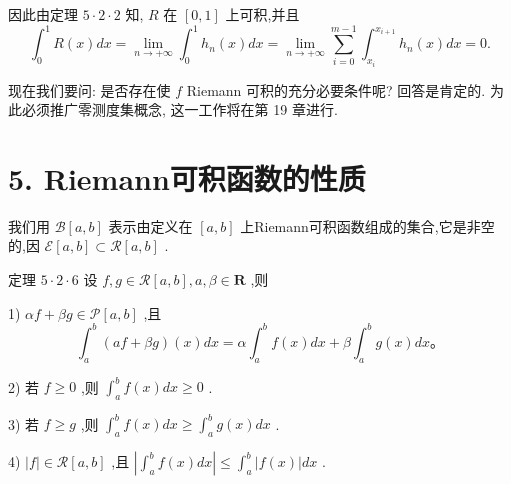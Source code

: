 因此由定理 $5 \cdot  2 \cdot  2$ 知, $R$ 在 $\left\lbrack  {0,1}\right\rbrack$ 上可积,并且
$${\int }_{0}^{1}R\left( x\right) {dx} = \mathop{\lim }\limits_{{n \rightarrow   + \infty }}{\int }_{0}^{1}{h}_{n}\left( x\right) {dx} = \mathop{\lim }\limits_{{n \rightarrow   + \infty }}\mathop{\sum }\limits_{{i = 0}}^{{m - 1}}{\int }_{{x}_{i}}^{{x}_{i + 1}}{h}_{n}\left( x\right) {dx} = 0.$$

现在我们要问: 是否存在使 $f$ Riemann 可积的充分必要条件呢? 回答是肯定的. 为此必须推广零测度集概念, 这一工作将在第 19 章进行.


\section*{5. Riemann可积函数的性质}

我们用 $\mathcal{B}\left\lbrack  {a,b}\right\rbrack$ 表示由定义在 $\left\lbrack  {a,b}\right\rbrack$ 上Riemann可积函数组成的集合,它是非空的,因 $\mathcal{E}\left\lbrack  {a,b}\right\rbrack   \subset  \mathcal{R}\left\lbrack  {a,b}\right\rbrack$ .

定理 $5 \cdot  2 \cdot  6$ 设 $f,g \in  \mathcal{R}\left\lbrack  {a,b}\right\rbrack  ,a,\beta  \in  \mathbf{R}$ ,则

1) ${\alpha f} + {\beta g} \in  \mathcal{P}\left\lbrack  {a,b}\right\rbrack$ ,且
$${\int }_{a}^{b}\left( {{af} + {\beta g}}\right) \left( x\right) {dx} = \alpha {\int }_{a}^{b}f\left( x\right) {dx} + \beta {\int }_{a}^{b}g\left( x\right) {dx}。$$

2) 若 $f \geq  0$ ,则 ${\int }_{a}^{b}f\left( x\right) {dx} \geq  0$ .

3) 若 $f \geq  g$ ,则 ${\int }_{a}^{b}f\left( x\right) {dx} \geq  {\int }_{a}^{b}g\left( x\right) {dx}$ .

4) $\left| f\right|  \in  \mathcal{R}\left\lbrack  {a,b}\right\rbrack$ ,且 $\left| {{\int }_{a}^{b}f\left( x\right) {dx}}\right|  \leq  {\int }_{a}^{b}\left| {f\left( x\right) }\right| {dx}$ .

